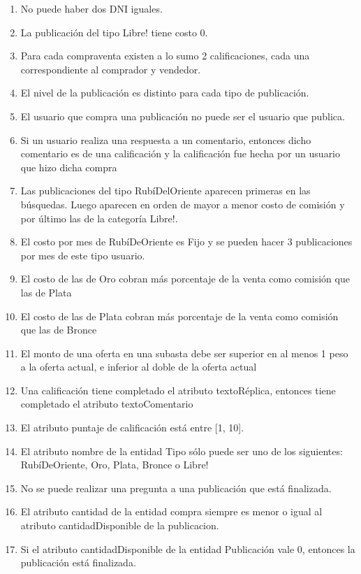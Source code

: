 \documentclass[a4paper, 10pt, twoside]{article}
\begin{document}
\begin{enumerate}
\item No puede haber dos DNI iguales. 
\item La publicaci\'on del tipo Libre! tiene costo 0.
\item Para cada compraventa existen a lo sumo 2 calificaciones, cada una correspondiente al comprador y vendedor.
\item El nivel de la publicaci\'on es distinto para cada tipo de publicaci\'on.
\item El usuario que compra una publicaci\'on no puede ser el usuario que publica.
\item Si un usuario realiza una respuesta a un comentario, entonces dicho comentario es de una calificaci\'on y la calificaci\'on fue hecha por un usuario que hizo dicha  compra 
\item Las publicaciones del tipo Rub\'iDelOriente aparecen primeras en las b\'usquedas. Luego aparecen en orden de mayor a menor costo de comisi\'on y por \'ultimo las de la categor\'ia Libre!.
\item El costo por mes de Rub\'iDeOriente es Fijo y se pueden hacer 3 publicaciones por mes de este tipo usuario.
\item El costo de las de Oro cobran m\'as porcentaje de la venta como comisi\'on que las de Plata
\item El costo de las de Plata cobran m\'as porcentaje de la venta como comisi\'on que las de Bronce 
\item El monto de una oferta en una subasta debe ser superior en al menos 1 peso a la oferta actual, e inferior al doble de la oferta actual
\item Una calificaci\'on tiene completado el atributo textoR\'eplica, entonces tiene completado el atributo textoComentario
\item El atributo puntaje de calificaci\'on est\'a entre [1, 10].
\item El atributo nombre de la entidad Tipo s\'olo puede ser uno de los siguientes: Rub\'iDeOriente,  Oro,  Plata,  Bronce o Libre! 
\item No se puede realizar una pregunta a una publicaci\'on que est\'a finalizada.
\item El atributo cantidad de la entidad compra siempre es menor o igual al atributo cantidadDisponible de la publicacion.
\item Si el atributo cantidadDisponible de la entidad Publicaci\'on vale 0, entonces la publicaci\'on est\'a finalizada. 
	

\end{enumerate}
\end{document}
